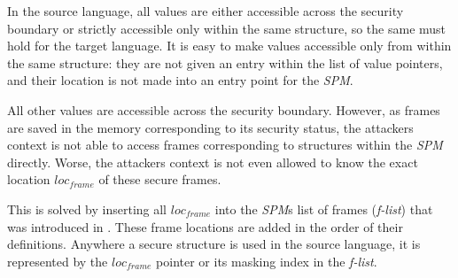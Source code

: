 \documentclass[10pt,a4paper,master=cws, masteroption=ai,english,inputenc=utf8]{kulemt}
\begin{document}
In the source language, all values are either accessible across the security boundary or strictly accessible only within the same structure, so the same must hold for the target language.
It is easy to make values accessible only from within the same structure: they are not given an entry within the list of value pointers, and their location is not made into an entry point for the \emph{SPM}.

All other values are accessible across the security boundary. However, as frames are saved in the memory corresponding to its security status, the attackers context is not able to access frames corresponding to structures within the \emph{SPM} directly.
Worse, the attackers context is not even allowed to know the exact location $loc_{frame}$ of these secure frames.

This is solved by inserting all $loc_{frame}$ into the \emph{SPM}s list of frames (\emph{f-list}) that was introduced in . These frame locations are added in the order of their definitions. 
Anywhere a secure structure is used in the source language, it is represented by the $loc_{frame}$ pointer or its masking index in the \emph{f-list}.
\end{document}

